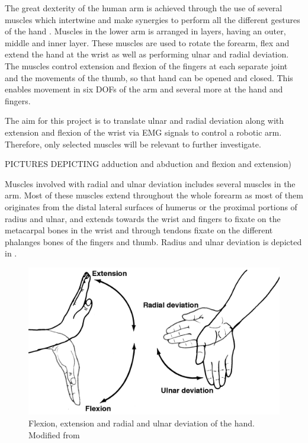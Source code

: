 The great dexterity of the human arm is achieved through the use of several muscles which intertwine and make synergies to perform all the different gestures of the hand \cite{jiang2009} \cite{avella2006}. Muscles in the lower arm is arranged in layers, having an outer, middle and inner layer. These muscles are used to rotate the forearm, flex and extend the hand at the wrist as well as performing ulnar and radial deviation. The muscles control extension and flexion of the fingers at each separate joint and the movements of the thumb, so that hand can be opened and closed. This enables movement in six DOFs of the arm and several more at the hand and fingers.

The aim for this project is to translate ulnar and radial deviation along with extension and flexion of the wrist via EMG signals to control a robotic arm. Therefore, only selected muscles will be relevant to further investigate. 


PICTURES DEPICTING adduction and abduction and flexion and extension)

Muscles involved with radial and ulnar deviation includes several muscles in the arm. Most of these muscles extend throughout the whole forearm as most of them originates from the distal lateral surfaces of humerus or the proximal portions of radius and ulnar, and extends towards the wrist and fingers to fixate on the metacarpal bones in the wrist and through tendons fixate on the different phalanges bones of the fingers and thumb. Radius and ulnar deviation is depicted in .

\begin{figure}[H]                                         %
	\includegraphics[width=.4\textwidth]{figures/anatomy/wrist_move}  %
	\caption{Flexion, extension and radial and ulnar deviation of the hand. Modified from  \cite{hamilton2008}}
	\label{fig:wrist_move}  %
\end{figure}

